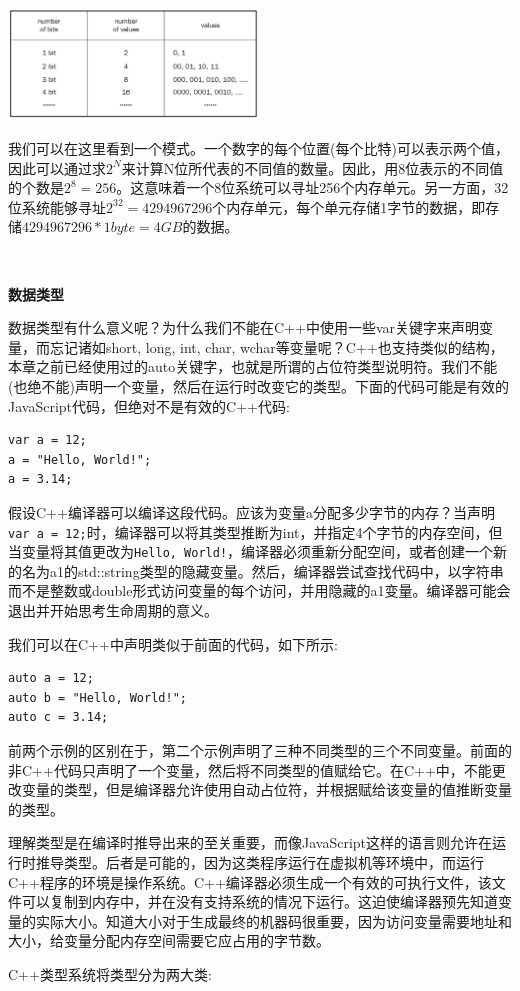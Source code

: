\begin{center}
	\includegraphics[width=0.5\textwidth]{content/Section-1/Chapter-2/8}
\end{center}

我们可以在这里看到一个模式。一个数字的每个位置(每个比特)可以表示两个值，因此可以通过求$2^N$来计算N位所代表的不同值的数量。因此，用8位表示的不同值的个数是$2^8 = 256$。这意味着一个8位系统可以寻址256个内存单元。另一方面，32位系统能够寻址$2^{32} = 4294967296$个内存单元，每个单元存储1字节的数据，即存储$4294967296 * 1byte= 4GB$的数据。

\noindent\textbf{}\ \par
\textbf{数据类型} \ \par
数据类型有什么意义呢？为什么我们不能在C++中使用一些var关键字来声明变量，而忘记诸如short, long, int, char, wchar等变量呢？C++也支持类似的结构，本章之前已经使用过的auto关键字，也就是所谓的占位符类型说明符。我们不能(也绝不能)声明一个变量，然后在运行时改变它的类型。下面的代码可能是有效的JavaScript代码，但绝对不是有效的C++代码: \par

\begin{lstlisting}[caption={}]
var a = 12;
a = "Hello, World!";
a = 3.14;
\end{lstlisting}

假设C++编译器可以编译这段代码。应该为变量a分配多少字节的内存？当声明\texttt{var a = 12;}时，编译器可以将其类型推断为int，并指定4个字节的内存空间，但当变量将其值更改为\texttt{Hello, World!}，编译器必须重新分配空间，或者创建一个新的名为a1的std::string类型的隐藏变量。然后，编译器尝试查找代码中，以字符串而不是整数或double形式访问变量的每个访问，并用隐藏的a1变量。编译器可能会退出并开始思考生命周期的意义。 \par
我们可以在C++中声明类似于前面的代码，如下所示: \par

\begin{lstlisting}[caption={}]
auto a = 12;
auto b = "Hello, World!";
auto c = 3.14;
\end{lstlisting}

前两个示例的区别在于，第二个示例声明了三种不同类型的三个不同变量。前面的非C++代码只声明了一个变量，然后将不同类型的值赋给它。在C++中，不能更改变量的类型，但是编译器允许使用自动占位符，并根据赋给该变量的值推断变量的类型。\par
理解类型是在编译时推导出来的至关重要，而像JavaScript这样的语言则允许在运行时推导类型。后者是可能的，因为这类程序运行在虚拟机等环境中，而运行C++程序的环境是操作系统。C++编译器必须生成一个有效的可执行文件，该文件可以复制到内存中，并在没有支持系统的情况下运行。这迫使编译器预先知道变量的实际大小。知道大小对于生成最终的机器码很重要，因为访问变量需要地址和大小，给变量分配内存空间需要它应占用的字节数。 \par
C++类型系统将类型分为两大类: \par

